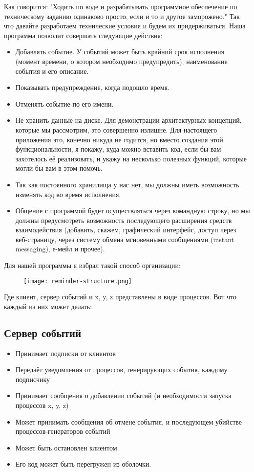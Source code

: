 Как говорится: "Ходить по воде и разрабатывать программное обеспечение по техническому заданию одинаково просто, если и то и другое заморожено."
Так что давайте разработаем технические условия и будем их придерживаться.
Наша программа позволит совершать следующие действия:
\begin{itemize}
\item Добавлять событие.
У событий может быть крайний срок исполнения (момент времени, о котором необходимо предупредить), наименование события и его описание.
\item Показывать предупреждение, когда подошло время.
\item Отменять событие по его имени.
\item Не хранить данные на диске.
Для демонстрации архитектурных концепций, которые мы рассмотрим, это совершенно излишне.
Для настоящего приложения это, конечно никуда не годится, но вместо создания этой функциональности, я покажу, куда можно вставить код, если бы вам захотелось её реализовать, и укажу на несколько полезных функций, которые могли бы вам в этом помочь.
\item Так как постоянного хранилища у нас нет, мы должны иметь возможность изменять код во время исполнения.
\item Общение с программой будет осуществляться через командную строку, но мы должны предусмотреть возможность последующего расширения  средств взаимодействия (добавить, скажем, графический интерфейс, доступ через веб\--страницу, через систему обмена мгновенными сообщениями (instant messaging), е\--мейл и прочее).
\end{itemize}

Для нашей программы я избрал такой способ организации:
\begin{figure}[h!]
    \centering
    \texttt{[image: reminder-structure.png]}
\end{figure}

Где клиент, сервер событий и x, y, z представлены в виде процессов.
Вот что каждый из них может делать:
\subsection{Сервер событий}
\begin{itemize}
\item Принимает подписки от клиентов
\item Передаёт уведомления от процессов, генерирующих события, каждому подписчику
\item Принимает сообщения о добавлении событий (и необходимости запуска процессов x, y, z)
\item Может принимать сообщения об отмене события, и последующем убийстве процессов\--генераторов событий
\item Может быть остановлен клиентом
\item Его код может быть перегружен из оболочки.
\end{itemize}

